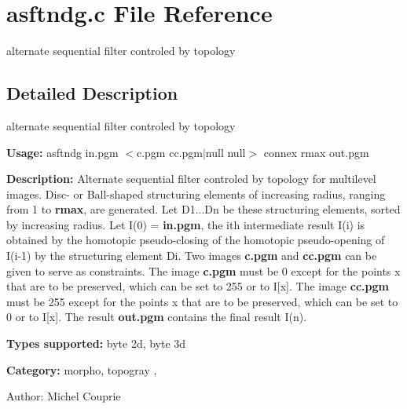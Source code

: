 \section{asftndg.c File Reference}
\label{asftndg_8c}
alternate sequential filter controled by topology  




\label{_details}
\subsection{Detailed Description}
alternate sequential filter controled by topology 

{\bf Usage:} asftndg in.pgm $<$c.pgm cc.pgm$|$null null$>$ connex rmax out.pgm

{\bf Description:} Alternate sequential filter controled by topology for multilevel images. Disc- or Ball-shaped structuring elements of increasing radius, ranging from 1 to {\bf rmax}, are generated. Let D1...Dn be these structuring elements, sorted by increasing radius. Let I(0) = {\bf in.pgm}, the ith intermediate result I(i) is obtained by the homotopic pseudo-closing of the homotopic pseudo-opening of I(i-1) by the structuring element Di. Two images {\bf c.pgm} and {\bf cc.pgm} can be given to serve as constraints. The image {\bf c.pgm} must be 0 except for the points x that are to be preserved, which can be set to 255 or to I[x]. The image {\bf cc.pgm} must be 255 except for the points x that are to be preserved, which can be set to 0 or to I[x]. The result {\bf out.pgm} contains the final result I(n).

{\bf Types supported:} byte 2d, byte 3d

{\bf Category:} morpho, topogray ,

\begin{Desc}
\item[Author:]Michel Couprie \end{Desc}
